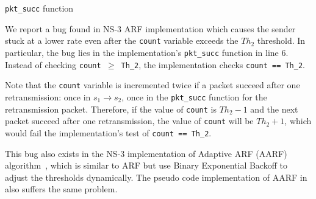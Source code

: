 \begin{algorithm}[t!]
  \caption{\texttt{pkt\_succ} function}
  \label{alg:pkt_succ}
  \begin{algorithmic}[1]
    \EndIf
    \EndFunction
  \end{algorithmic}
\end{algorithm}

We report a bug found in NS-3 ARF implementation which causes the sender stuck
at a lower rate even after the \texttt{count} variable exceeds the $Th_2$
threshold. In particular, the bug lies in the implementation's
\texttt{pkt\_succ} function in line 6. Instead of checking \texttt{count $\ge$
Th\_2}, the implementation checks \texttt{count == Th\_2}.

Note that the \texttt{count} variable is incremented twice if a packet succeed
after one retransmission: once in $s_1\rightarrow s_2$, once in the
\texttt{pkt\_succ} function for the retransmission packet. Therefore, if the
value of \texttt{count} is $Th_2-1$ and the next packet succeed after one
retransmission, the value of \texttt{count} will be $Th_2+1$, which would fail
the implementation's test of \texttt{count == Th\_2}.

This bug also exists in the NS-3 implementation of Adaptive ARF (AARF)
algorithm~\cite{lacage2004ieee}, which is similar to ARF but use Binary
Exponential Backoff to adjust the thresholds dynamically. The pseudo code
implementation of AARF in~\cite{lacage2004report} also suffers the same problem.
